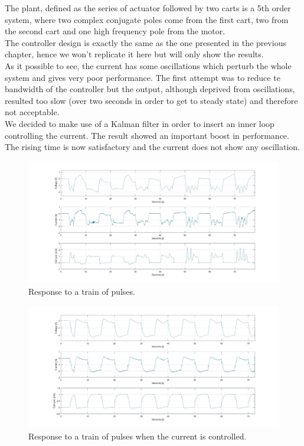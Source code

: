 The plant, defined as the series of actuator followed by two carts is a 5th order system, where two complex conjugate poles come from the first cart, two from the second cart and one high frequency pole from the motor.\\

The controller design is exactly the same as the one presented in the previous chapter, hence we won't replicate it here but will only show the results.\\

As it possible to see, the current has some oscillations which perturb the whole system and gives very poor performance. The first attempt was to reduce te bandwidth of the controller but the output, although deprived from oscillations, resulted too slow (over two seconds in order to get to steady state) and therefore not acceptable.\\

We decided to make use of a Kalman filter in order to insert an inner loop controlling the current. The result showed an important boost in performance. The rising time is now satisfactory and the current does not show any oscillation.\\

\begin{figure}[h]
	\centering
	\includegraphics[width=0.9\linewidth]{img/hinf_nocurr}
	\caption{Response to a train of pulses.}
	\label{fig:hinfnocurr}
\end{figure}

\begin{figure}[h]
	\centering
	\includegraphics[width=0.9\linewidth]{img/hinf_curr}
	\caption{Response to a train of pulses when the current is controlled.}
	\label{fig:hinfnocurr}
\end{figure}

